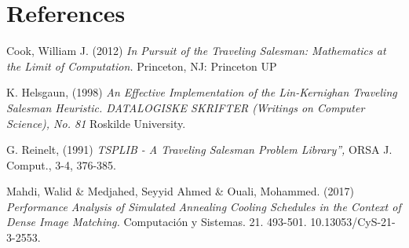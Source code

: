 \documentclass{article}
\begin{document}
\section{References}

\begin{thebibliography}{9}

Cook, William J. (2012) \emph{In Pursuit of the Traveling Salesman: Mathematics at the Limit of Computation.} Princeton, NJ: Princeton UP

K. Helsgaun, (1998) \emph{An Effective Implementation of the Lin-Kernighan Traveling Salesman Heuristic. DATALOGISKE SKRIFTER (Writings on Computer Science), No. 81} Roskilde University.

G. Reinelt, (1991) \emph{TSPLIB - A Traveling Salesman Problem Library”,} ORSA J. Comput., 3-4, 376-385.

Mahdi, Walid & Medjahed, Seyyid Ahmed \& Ouali, Mohammed. (2017) \emph{Performance Analysis of Simulated Annealing Cooling Schedules in the Context of Dense Image Matching.} Computación y Sistemas. 21. 493-501. 10.13053/CyS-21-3-2553. 
\end{thebibliography}
\end{document}
